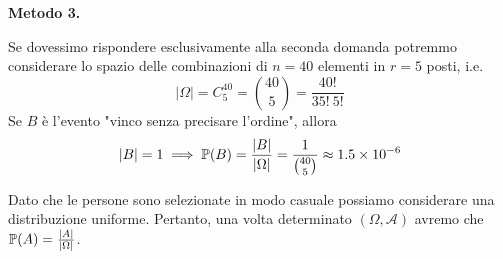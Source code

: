\textbf{Metodo 3.}

Se dovessimo rispondere esclusivamente alla seconda domanda potremmo considerare lo spazio delle combinazioni di $n=40$ elementi in $r=5$ posti, i.e.
\begin{equation*}
	| \Omega | =C_{5}^{40} =\binom{40}{5} =\frac{40!}{35!\ 5!}
\end{equation*}
Se $B$ è l'evento "vinco senza precisare l'ordine", allora
\begin{equation*}
	| B| =1\implies \mathbb{P}(B) =\frac{| B| }{| \Omega | } =\frac{1}{\binom{40}{5}} \approx 1.5\times 10^{-6}
\end{equation*}

\Soluzione

Dato che le persone sono selezionate in modo casuale possiamo considerare una distribuzione uniforme. Pertanto, una volta determinato $(\Omega ,\mathcal{A})$ avremo che $\mathbb{P}(A) =\frac{| A| }{| \Omega | }$.
